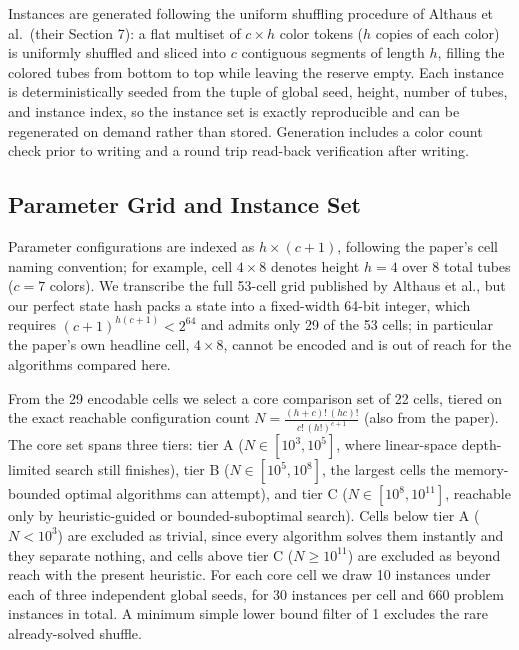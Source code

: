 \documentclass[letterpaper]{article}
\begin{document}
Instances are generated following the uniform shuffling procedure of
Althaus et al.\ (their Section 7): a flat multiset of $c \times h$ color
tokens ($h$ copies of each color) is uniformly shuffled and sliced into $c$
contiguous segments of length $h$, filling the colored tubes from bottom to
top while leaving the reserve empty. Each instance is deterministically
seeded from the tuple of global seed, height, number of tubes, and instance
index, so the instance set is exactly reproducible and can be regenerated on
demand rather than stored. Generation includes a color count check prior to
writing and a round trip read-back verification after writing.

\subsection{Parameter Grid and Instance Set}

Parameter configurations are indexed as $h \times (c+1)$, following the
paper's cell naming convention; for example, cell $4 \times 8$ denotes
height $h=4$ over 8 total tubes ($c=7$ colors). We transcribe the full
53-cell grid published by Althaus et al., but our perfect state hash packs a
state into a fixed-width 64-bit integer, which requires
$(c+1)^{h(c+1)} < 2^{64}$ and admits only 29 of the 53 cells; in particular
the paper's own headline cell, $4 \times 8$, cannot be encoded and is out of
reach for the algorithms compared here.

From the 29 encodable cells we select a core comparison set of 22 cells,
tiered on the exact reachable configuration count
$N = \frac{(h+c)! \, (hc)!}{c! \, (h!)^{c+1}}$ (also from the paper). The
core set spans three tiers: tier A ($N \in [10^3, 10^5]$, where
linear-space depth-limited search still finishes), tier B
($N \in [10^5, 10^8]$, the largest cells the memory-bounded optimal
algorithms can attempt), and tier C ($N \in [10^8, 10^{11}]$, reachable
only by heuristic-guided or bounded-suboptimal search). Cells below tier A
($N < 10^3$) are excluded as trivial, since every algorithm solves them
instantly and they separate nothing, and cells above tier C
($N \geq 10^{11}$) are excluded as beyond reach with the present heuristic.
For each core cell we draw 10 instances under each of three independent
global seeds, for 30 instances per cell and 660 problem instances in total.
A minimum simple lower bound filter of 1 excludes the rare already-solved
shuffle.
\end{document}
